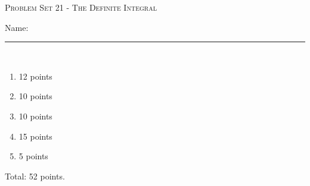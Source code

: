 \documentclass{article}
\begin{document}
\begin{center}
\large\textsc{Problem Set 21 - The Definite Integral}
  
      \pspace{12pt}
  \begin{problemonly}\large Name: \rule{5cm}{0.15mm}\\ \end{problemonly}
\end{center}


\begin{grading}
\begin{enumerate}
    \item 12 points
    \item 10 points
    \item 10 points
    \item 15 points
    \item 5 points
\end{enumerate}
Total: 52 points.
\end{grading}
\end{document}
